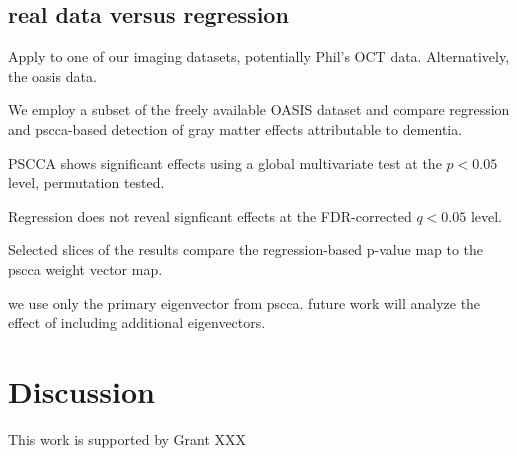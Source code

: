 \documentclass{llncs}
\begin{document}
\subsection{real data versus regression}
Apply to one of our imaging datasets, potentially Phil's OCT data.
Alternatively, the oasis data. 

We employ a subset of the freely available OASIS dataset and compare
regression and pscca-based detection of gray matter effects
attributable to dementia.

PSCCA shows significant effects using a global multivariate test at
the $p<0.05$ level, permutation tested.  

Regression does not reveal signficant effects at the FDR-corrected
$q<0.05$ level.  

Selected slices of the results compare the regression-based p-value
map to the pscca weight vector map.  

we use only the primary eigenvector from pscca.  future work will
analyze the effect of including additional eigenvectors. 

\section{Discussion}

 This work is supported by Grant XXX 


\end{document}
